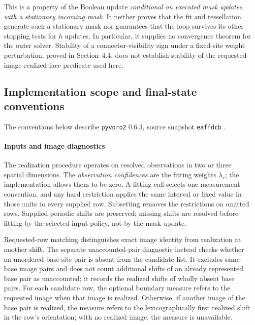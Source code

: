 This is a property of the Boolean update \emph{conditional on executed mask updates with a stationary incoming mask}. It neither proves that the fit and tessellation generate such a stationary mask nor guarantees that the loop survives its other stopping tests for $h$ updates. In particular, it supplies no convergence theorem for the outer solver. Stability of a connector-visibility sign under a fixed-site weight perturbation, proved in Section~4.4, does not establish stability of the requested-image realized-face predicate used here.

\subsection{Implementation scope and final-state conventions}
\label{app:algorithm-implementation}

The conventions below describe \texttt{pyvoro2} 0.6.3, source snapshot
\texttt{eaffdcb} \citep{Pyvoro2_063}.

\paragraph{Inputs and image diagnostics}
The realization procedure operates on resolved observations in two or three spatial dimensions. The \emph{observation confidences} are the fitting weights $\lambda_r$; the implementation allows them to be zero. A fitting call selects one measurement convention, and any hard restriction applies the same interval or fixed value in those units to every supplied row. Subsetting removes the restrictions on omitted rows. Supplied periodic shifts are preserved; missing shifts are resolved before fitting by the selected input policy, not by the mask update.

Requested-row matching distinguishes exact image identity from realization at another shift. The separate unaccounted-pair diagnostic instead checks whether an unordered base-site pair is absent from the candidate list. It excludes same-base image pairs and does not count additional shifts of an already represented base pair as unaccounted; it records the realized shifts of wholly absent base pairs. For each candidate row, the optional boundary measure refers to the requested image when that image is realized. Otherwise, if another image of the base pair is realized, the measure refers to the lexicographically first realized shift in the row's orientation; with no realized image, the measure is unavailable.

